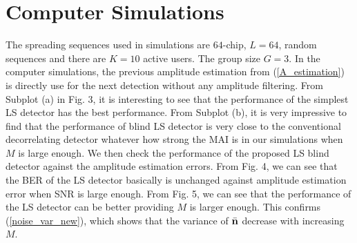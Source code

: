 \documentclass[a4paper,10pt,fleqn, twocolumn]{IEEETran}
\newcommand{\bn}{{\bf n}}
\begin{document}
\section{Computer Simulations}
The spreading sequences used in simulations are $64$-chip, $L=64$,
random sequences and there are $K=10$ active users. The group size
$G=3$. In the computer simulations, the previous amplitude
estimation from (\ref{A_estimation}) is directly use for the next
detection without any amplitude filtering. From Subplot (a) in
Fig. 3, it is interesting to see that the performance of the
simplest LS detector has the best performance. From Subplot (b),
it is very impressive to find that the performance of blind LS
detector is very close to the conventional decorrelating detector
whatever how strong the MAI is in our simulations when $M$ is
large enough. We then check the performance of the proposed LS
blind detector against the amplitude estimation errors. From Fig.
4, we can see that the BER of the LS detector basically is
unchanged against amplitude estimation error when SNR is large
enough. From Fig. 5, we can see that the performance of the LS
detector can be better providing $M$ is larger enough. This
confirms (\ref{noise_var_new}), which shows that the variance of
$\bar{\bn}$ decrease with increasing $M$.
\begin{figure} \label{BER_SNR}
\end{figure}
\begin{figure} \label{BER_A_SNR}
\end{figure}
\end{document}
